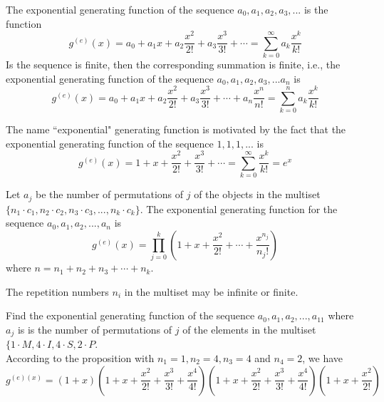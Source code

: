 \documentclass[handout]{ximera}
\begin{document}
\begin{definition}
The exponential generating function of the sequence $a_0, a_1, a_2, a_3, ...$ is the function
\[
g^{(e)}(x) = a_0 + a_1x + a_2\frac{x^2}{2!} + a_3\frac{x^3}{3!} + \cdots = \sum_{k=0}^\infty a_k \frac{x^k}{k!}
\]
Is the sequence is finite, then the corresponding summation is finite, i.e., the exponential generating function of the sequence
$a_0, a_1, a_2, a_3, ...a_n$ is
\[
g^{(e)}(x) = a_0 + a_1x + a_2\frac{x^2}{2!} + a_3\frac{x^3}{3!} + \cdots  + a_n\frac{x^n}{n!} = \sum_{k=0}^n a_k \frac{x^k}{k!}
\]
\end{definition}

\begin{remark} The name ``exponential" generating function is motivated by the fact that the exponential 
generating function of the sequence $1, 1, 1, ...$ is
\[
g^{(e)}(x) = 1 + x + \frac{x^2}{2!} + \frac{x^3}{3!} + \cdots = \sum_{k=0}^\infty \frac{x^k}{k!} = e^x
\]
\end{remark}

\begin{proposition}
Let $a_j$ be the number of permutations of $j$ of the objects in the 
multiset $\{n_1 \cdot c_1, n_2 \cdot c_2, n_3 \cdot c_3, ..., n_k \cdot c_k\}$.
The exponential generating function for the sequence $a_0, a_1, a_2, ..., a_n$ 
is 
\[
g^{(e)}(x) = \prod_{j=0}^k \left(1 + x + \frac{x^2}{2!} + \cdots + \frac{x^{n_j}}{n_j !}\right)
\]
where $n = n_1 + n_2 + n_3 + \cdots + n_k$.
\end{proposition}
\begin{remark}
The repetition numbers $n_i$ in the multiset may be infinite or finite.
\end{remark}

\begin{example}[example 1] 
Find the exponential generating function of the sequence $a_0, a_1, a_2, ..., a_{11}$ where $a_j$ is is the number of 
permutations of $j$ of the elements in the multiset $\{1\cdot M, 4\cdot I, 4\cdot S, 2\cdot P$.\\
According to the proposition with $n_1 = 1, n_2 = 4, n_3 = 4$ and $n_4 = 2$, we have
\[
g^{(e)(x)} = \left(1+x\right)\left(1+x+\frac{x^2}{2!} + \frac{x^3}{3!} + \frac{x^4}{4!}\right)
\left(1+x+\frac{x^2}{2!} + \frac{x^3}{3!} + \frac{x^4}{4!}\right)
\left(1+x+\frac{x^2}{2!}\right)
\]
\end{example}
\end{document}
